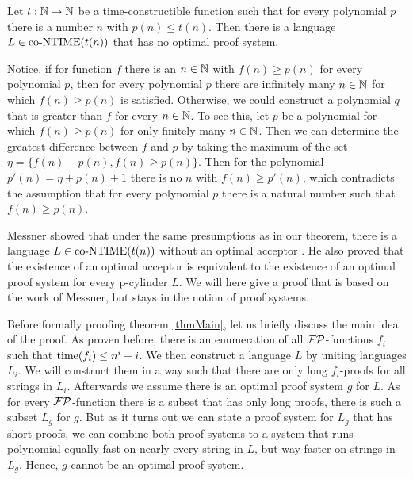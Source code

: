   \begin{theorem}\label{thmMain}
    Let \(t : \mathbb{N} \to \mathbb{N}\) be a time-constructible function such that for every polynomial \(p\) there is a number \(n\) with \(p(n) \leq t(n)\). Then there is a language \(L \in \text{co-NTIME}(t(n))\) that has no optimal proof system.
  \end{theorem}

  Notice, if for function \(f\) there is an \(n \in \mathbb{N}\) with \(f(n) \geq p(n)\) for every polynomial \(p\), then for every polynomial \(p\) there are infinitely many \(n \in \mathbb{N}\) for which \(f(n) \geq p(n)\) is satisfied. Otherwise, we could construct a polynomial \(q\) that is greater than \(f\) for every \(n \in \mathbb{N}\). To see this, let \(p\) be a polynomial for which \(f(n) \geq p(n)\) for only finitely many \(n \in \mathbb{N}\). Then we can determine the greatest difference between \(f\) and \(p\) by taking the maximum of the set \(\eta = \{ f(n) - p(n), f(n) \geq p(n) \}\). Then for the polynomial \(p'(n) = \eta + p(n) + 1\) there is no \(n\) with \(f(n) \geq p'(n)\), which contradicts the assumption that for every polynomial \(p\) there is a natural number such that \(f(n) \geq p(n)\).

  Messner showed that under the same presumptions as in our theorem, there is a language \(L \in \text{co-NTIME}(t(n))\) without an optimal acceptor \cite{Mes99}. He also proved that the existence of an optimal acceptor is equivalent to the existence of an optimal proof system for every p-cylinder \(L\). We will here give a proof that is based on the work of Messner, but stays in the notion of proof systems.

  Before formally proofing theorem \ref{thmMain}, let us briefly discuss the main idea of the proof. As proven before, there is an enumeration of all \(\mathcal{FP}\)-functions \(f_i\) such that \(\operatorname{time}(f_i) \leq n^i + i\). We then construct a language \(L\) by uniting languages \(L_i\). We will construct them in a way such that there are only long \(f_i\)-proofs for all strings in \(L_i\). Afterwards we assume there is an optimal proof system \(g\) for \(L\). As for every \(\mathcal{FP}\)-function there is a subset that has only long proofs, there is such a subset \(L_g\) for \(g\). But as it turns out we can state a proof system for \(L_g\) that has short proofs, we can combine both proof systems to a system that runs polynomial equally fast on nearly every string in \(L\), but way faster on strings in \(L_g\). Hence, \(g\) cannot be an optimal proof system.
  

